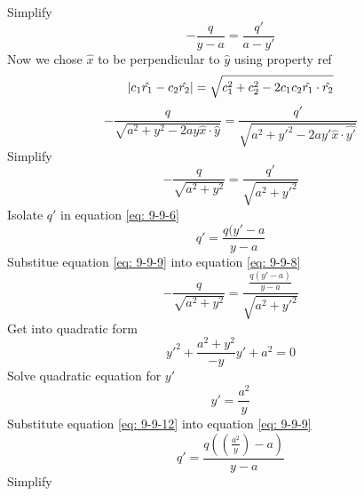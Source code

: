 \documentclass[12pt]{article}
\begin{document}
    Simplify
    \begin{equation} \label{eq: 9-9-6}
        -\frac{q}{y - a} = \frac{q'}{a - y'}
    \end{equation}   
    Now we chose $\hat{x}$ to be perpendicular to $\hat{y}$ using property ref
    \begin{gather*}
        \abs{c_1 \hat{r_1} - c_2 \hat{r_2}} = \sqrt{c_1^2 + c_2^2 - 2 c_1 c_2 \hat{r_1} \cdot \hat{r_2}}
    \end{gather*}
    \begin{equation} \label{eq: 9-9-7}
        -\frac{q}{\sqrt{a^2 + y^2 - 2 a y \hat{x} \cdot \hat{y}}} = \frac{q'}{\sqrt{a^2 + {y'}^2 - 2 a y' \hat{x} \cdot \hat{y'}}}
    \end{equation}
    Simplify
    \begin{equation} \label{eq: 9-9-8}
        -\frac{q}{\sqrt{a^2 + y^2}} = \frac{q'}{\sqrt{a^2 + {y'}^2}}
    \end{equation}
    Isolate $q'$ in equation \ref{eq: 9-9-6}
    \begin{equation} \label{eq: 9-9-9}
        q' = \frac{q (y' - a}{y - a}
    \end{equation}
    Substitue equation \ref{eq: 9-9-9} into equation \ref{eq: 9-9-8}
    \begin{equation} \label{eq: 9-9-10}
        -\frac{q}{\sqrt{a^2 + y^2}} = \frac{\frac{q (y' - a)}{y - a}}{\sqrt{a^2 + {y'}^2}}
    \end{equation}
    Get into quadratic form
    \begin{equation} \label{eq: 9-9-11}
        {y'}^2 + \frac{a^2 + y^2}{-y} y' + a^2 = 0
    \end{equation}
    Solve quadratic equation for $y'$
    \begin{equation} \label{eq: 9-9-12}
        y' = \frac{a^2}{y}
    \end{equation}
    Substitute equation \ref{eq: 9-9-12} into equation \ref{eq: 9-9-9}
    \begin{equation} \label{eq: 9-9-13}
        q' = \frac{q ((\frac{a^2}{y}) - a)}{y-a}
    \end{equation}
    Simplify
\end{document}
